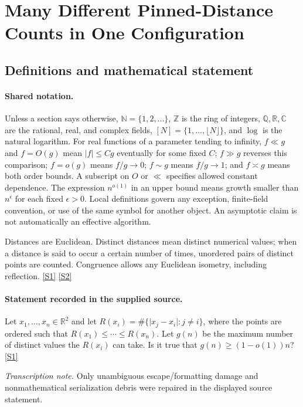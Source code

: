 \documentclass[11pt,a4paper]{article}
\newcommand{\N}{\mathbb{N}}
\newcommand{\Z}{\mathbb{Z}}
\newcommand{\Q}{\mathbb{Q}}
\newcommand{\R}{\mathbb{R}}
\newcommand{\C}{\mathbb{C}}
\newcommand{\sref}[2]{\hyperlink{source:#1:#2}{[S#2]}}
\begin{document}
\section{Many Different Pinned-Distance Counts in One Configuration}\label{statement}


\subsection{Definitions and mathematical statement}

\paragraph{Shared notation.}Unless a section says otherwise, $\N=\{1,2,\ldots\}$,
$\Z$ is the ring of integers, $\Q,\R,\C$ are the rational, real, and complex
fields, $[N]=\{1,\ldots,\lfloor N\rfloor\}$, and $\log$ is the natural
logarithm. For real functions of a parameter tending to infinity,
$f\ll g$ and $f=O(g)$ mean $|f|\leq Cg$ eventually for some fixed $C$;
$f\gg g$ reverses this comparison; $f=o(g)$ means $f/g\to0$;
$f\sim g$ means $f/g\to1$; and $f\asymp g$ means both order bounds.
A subscript on $O$ or $\ll$ specifies allowed constant dependence.
The expression $n^{o(1)}$ in an upper bound means growth smaller than
$n^\epsilon$ for each fixed $\epsilon>0$. Local definitions govern any
exception, finite-field convention, or use of the same symbol for another
object. An asymptotic claim is not automatically an effective algorithm.



Distances are Euclidean. Distinct distances mean distinct numerical values; when a distance is said to occur a certain number of times, unordered pairs of distinct points are counted. Congruence allows any Euclidean isometry, including reflection. \sref{statement}{1} \sref{statement}{2}

\paragraph{Statement recorded in the supplied source.}
Let $x_1,\ldots,x_n\in \mathbb{R}^2$ and let $R(x_i)=\#\{ \lvert x_j-x_i\rvert : j\neq i\}$, where the points are ordered such that $ R(x_1)\leq \cdots \leq R(x_n). $ Let $g(n)$ be the maximum number of distinct values the $R(x_i)$ can take. Is it true that $g(n) \geq (1-o(1))n$? \sref{statement}{1}

{\small\emph{Transcription note.} Only unambiguous escape/formatting damage and nonmathematical serialization debris were repaired in the displayed source statement.}
\end{document}

